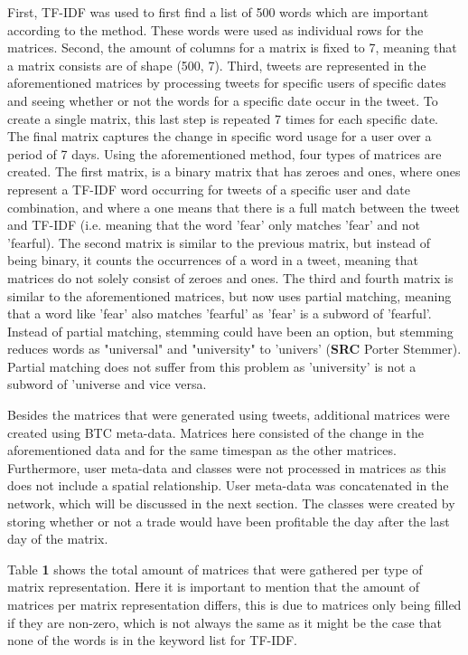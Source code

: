 \documentclass{article}
\begin{document}
First, TF-IDF was used to first find a list of 500 words which are important according to the method. These words were used as individual rows for the matrices. Second, the amount of columns for a matrix is fixed to 7, meaning that a matrix consists are of shape (500, 7). Third, tweets are represented in the aforementioned matrices by processing tweets for specific users of specific dates and seeing whether or not the words for a specific date occur in the tweet. To create a single matrix, this last step is repeated 7 times for each specific date. The final matrix captures the change in specific word usage for a user over a period of 7 days. Using the aforementioned method, four types of matrices are created. The first matrix, is a binary matrix that has zeroes and ones, where ones represent a TF-IDF word occurring for tweets of a specific user and date combination, and where a one means that there is a full match between the tweet and TF-IDF (i.e. meaning that the word 'fear' only matches 'fear' and not 'fearful). The second matrix is similar to the previous matrix, but instead of being binary, it counts the occurrences of a word in a tweet, meaning that matrices do not solely consist of zeroes and ones. The third and fourth matrix is similar to the aforementioned matrices, but now uses partial matching, meaning that a word like 'fear' also matches 'fearful' as 'fear' is a subword of 'fearful'. Instead of partial matching, stemming could have been an option, but stemming reduces words as "universal" and "university" to 'univers' (\textbf{SRC} Porter Stemmer). Partial matching does not suffer from this problem as 'university' is not a subword of 'universe and vice versa.

Besides the matrices that were generated using tweets, additional matrices were created using BTC meta-data. Matrices here consisted of the change in the aforementioned data and for the same timespan as the other matrices. Furthermore, user meta-data and classes were not processed in matrices as this does not include a spatial relationship. User meta-data was concatenated in the network, which will be discussed in the next section. The classes were created by storing whether or not a trade would have been profitable the day after the last day of the matrix.

Table \textbf{1} shows the total amount of matrices that were gathered per type of matrix representation. Here it is important to mention that the amount of matrices per matrix representation differs, this is due to matrices only being filled if they are non-zero, which is not always the same as it might be the case that none of the words is in the keyword list for TF-IDF.
\end{document}
